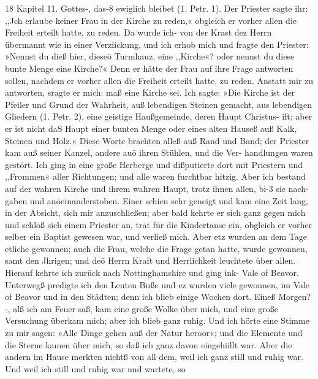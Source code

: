 18 Kapitel 11.
Gottes-, das-8 ewiglich bleibet (1. Petr. 1). Der Priester sagte ihr:
,,Jch erlaube keiner Frau in der Kirche zu reden,« obgleich er
vorher allen die Freiheit erteilt hatte, zu reden. Da wurde ich-
von der Krast dez Herrn übermannt wie in einer Verziickung,
und ich erhob mich und fragte den Priester: »Nennst du dieß
hier, dieseö Turmhauz, eine ,,Kirche«? oder nennst du diese
bunte Menge eine Kirche?« Denn er hätte der Frau auf ihre
Frage antworten sollen, nachdem er vorher allen die Freiheit
erteilt hatte, zu reden. Anstatt mir zu antworten, sragte er mich:
maß eine Kirche sei. Ich sagte: »Die Kirche ist der Pfeiler und
Grund der Wahrheit, auß lebendigen Steinen gemacht, aus
lebendigen Gliedern (1. Petr. 2), eine geistige Haußgemeinde,
deren Haupt Christus- ift; aber er ist nicht daS Haupt einer bunten
Menge oder eines alten Hauseß auß Kalk, Steinen und Holz.«
Diese Worte brachten alleß auß Rand und Band; der Priester
kam auß seiner Kanzel, andere auö ihren Stühlen, und die Ver-
handlungen waren gestört. Ich ging in eine große Herberge und
dißputierte dort mit Priestern und ,,Frommen« aller Richtungen;
und alle waren furchtbar hitzig. Aber ich bestand auf der wahren
Kirche und ihrem wahren Haupt, trotz ihnen allen, bi-3 sie nach-
gaben und auöeinanderstoben. Einer schien sehr geneigt und kam
eine Zeit lang, in der Absicht, sich mir anzuschließen; aber bald
kehrte er sich ganz gegen mich und schloß sich einem Priester an,
trat für die Kindertanse ein, obgleich er vorher selber ein
Baptist gewesen war, und verließ mich. Aber etz wurden an dem
Tage etliche gewonnen; auch die Frau, welche die Frage getan
hatte, wurde gewonnen, samt den Jhrigen; und deö Herrn Kraft
und Herrlichkeit leuchtete über allen.
Hierauf kehrte ich zurück nach Nottinghamshire und ging
ink- Vale of Beavor. Unterwegß predigte ich den Leuten Buße
und ez wurden viele gewonnen, im Vale of Beavor und in den
Städten; denn ich blieb einige Wochen dort. Eineß Morgen?-,
alß ich am Feuer saß, kam eine große Wolke über mich, und eine
große Versuchung überkam mich; aber ich blieb ganz ruhig. Und
ich hörte eine Stimme zu mir sagen: »Alle Dinge gehen auß der
Natur heroor«; und die Elemente und die Sterne kamen über
mich, so daß ich ganz davon eingehiillt war. Aber die andern
im Hause merkten nichtß von all dem, weil ich ganz still und
ruhig war. Und weil ich still und ruhig war und wartete, so



